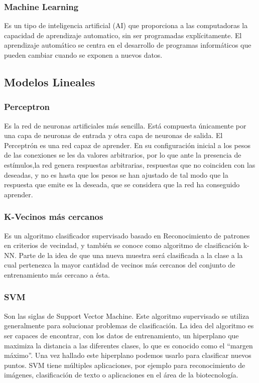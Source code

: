 \documentclass[a4paper]{article}
\begin{document}
\subsubsection{Machine Learning}
Es un tipo de inteligencia artificial (AI) que proporciona a las computadoras la capacidad de aprendizaje automatico, sin ser programadas explícitamente. El aprendizaje automático se centra en el desarrollo de programas informáticos que pueden cambiar cuando se exponen a nuevos datos.

\subsection*{Modelos Lineales}
\subsubsection*{Perceptron}
Es la red de neuronas artificiales más sencilla. Está compuesta únicamente por una capa de neuronas de entrada y otra capa de neuronas de salida. El Perceptrón es una red capaz de aprender. En su configuración inicial a los pesos de las conexiones se les da valores arbitrarios, por lo que ante la presencia de estímulos,la red genera respuestas arbitrarias, respuestas que no coinciden con las deseadas, y no es hasta que los pesos se han ajustado de tal modo que la respuesta que emite es la deseada, que se considera que la red ha conseguido aprender.

\subsubsection*{K-Vecinos m\'as cercanos}
Es un algoritmo clasificador supervisado basado en Reconocimiento de patrones en criterios de vecindad, y también se conoce como algoritmo de clasificación k-NN. Parte de la idea de que una nueva muestra será clasificada a la clase a la cual pertenezca la mayor cantidad de vecinos más cercanos del conjunto de entrenamiento más cercano a ésta.

\subsubsection*{SVM}
Son las siglas de Support Vector Machine. Este algoritmo supervisado se utiliza generalmente para solucionar problemas de clasificación. La idea del algoritmo es ser capaces de encontrar, con los datos de entrenamiento, un hiperplano que maximiza la distancia a las diferentes clases, lo que es conocido como el “margen máximo”.
Una vez hallado este hiperplano podemos usarlo para clasificar nuevos puntos.
SVM tiene múltiples aplicaciones, por ejemplo para reconocimiento de imágenes, clasificación de texto o aplicaciones en el área de la biotecnología.
\end{document}
